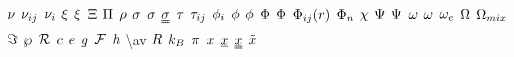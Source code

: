 \begin{mdframed}
$\kinvisc$ \newline
$\stoich$ \newline
$\chargeval$ \newline
$\conjcoortwo$ \newline
$\extent$ \newline
$\gcpf$ \newline
$\osmpress$ \newline
$\dens$ \newline
$\symfac$ \newline
$\molecrad$ \newline
$\stresstens$ \newline
$\torque$ \newline
$\shear$ \newline
$\fhmolefrac$ \newline
$\fugcoeff$ \newline
$\eleccoeff$ \newline
$\pot$ \newline
$\diss$ \newline
$\potfunc$ \newline
$\fftbasis$ \newline
$\fhparam$ \newline
$\streamfunc$ \newline
$\dlesselecpot$ \newline
$\mpf$ \newline
$\accentfac$ \newline
$\elecdegen$ \newline
$\mpc$ \newline
$\combmixfunc$ \newline
$\dof$ \newline
$\dynpress$ \newline
$\surfreac$ \newline
$\lightspeed$ \newline
$\e$ \newline
$\grav$ \newline
$\faraday$ \newline
$\planck$ \newline
  \textbackslash av \newline
$\gasconst$ \newline
$\boltz$ \newline
$\pie$ \newline
$\exscal$ \newline
$\exvecone$ \newline
$\exvectwo$ \newline
$\exvecthree$ \newline

\end{mdframed}
